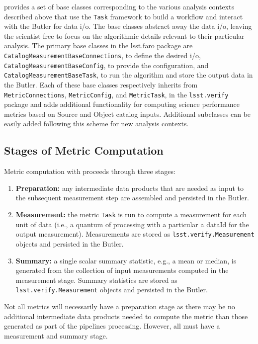 \faro provides a set of base classes corresponding to the various analysis contexts described above that use the \texttt{Task} framework to build a workflow and interact with the Butler for data i/o.
The base classes abstract away the data i/o, leaving the scientist free to focus on the algorithmic details  relevant to their particular analysis.
The primary base classes in the lsst.faro package are \texttt{CatalogMeasurementBaseConnections}, to define the desired i/o, \texttt{CatalogMeasurementBaseConfig}, to provide the configuration, and \texttt{CatalogMeasurementBaseTask}, to run the algorithm and store the output data in the Butler.
Each of these base classes respectively inherits from \texttt{MetricConnections}, \texttt{MetricConfig}, and \texttt{MetricTask}, in the \texttt{lsst.verify} package and adds additional functionality for computing science performance metrics based on Source and Object catalog inputs.
Additional subclasses can be easily added following this scheme for new analysis contexts.

\subsection{Stages of Metric Computation} \label{ssec:stages}

Metric computation with \faro proceeds through three stages:
\begin{enumerate}
\item \textbf{Preparation:} any intermediate data products that are needed as input to the subsequent measurement step are assembled and persisted in the Butler.
\item \textbf{Measurement:} the metric \texttt{Task} is run to compute a measurement for each unit of data (i.e., a quantum of processing with a particular a dataId for the output measurement). Measurements are stored as \texttt{lsst.verify.Measurement} objects and persisted in the Butler.
\item \textbf{Summary:} a single scalar summary statistic, e.g., a mean or median,  is generated from the collection of input measurements computed in the measurement stage. Summary statistics are stored as \texttt{lsst.verify.Measurement} objects and persisted in the Butler.
\end{enumerate}
Not all metrics will necessarily have a preparation stage as there may be no additional intermediate data products needed to compute the metric than those generated as part of the pipelines processing. However, all must have a measurement and summary stage.

